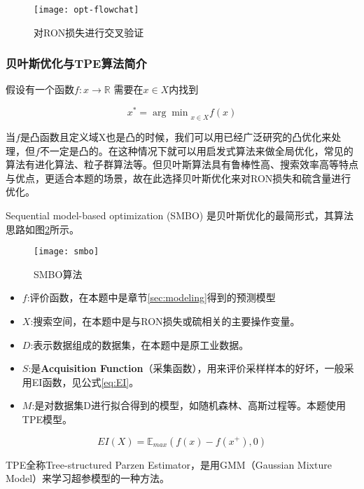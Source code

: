 \documentclass[bwprint]{gmcmthesis}
\begin{document}
\begin{figure}[htb]
	\centering
	\texttt{[image: opt-flowchat]}
	\caption{对RON损失进行交叉验证}
	\label{img:opt-flowchat}
\end{figure}




\FloatBarrier
\subsubsection{贝叶斯优化与TPE算法简介}

假设有一个函数$f:x\rightarrow \mathbb{R}$ 需要在$x\in X$内找到

\begin{equation}\label{eq:optimation}
	x^*={\arg\min}_{x\in X}f(x)
\end{equation}

当$f$是凸函数且定义域X也是凸的时候，我们可以用已经广泛研究的凸优化来处理，但$f$不一定是凸的。在这种情况下就可以用启发式算法来做全局优化，常见的算法有进化算法、粒子群算法等。但贝叶斯算法具有鲁棒性高、搜索效率高等特点与优点，更适合本题的场景，故在此选择贝叶斯优化来对RON损失和硫含量进行优化。

Sequential model-based optimization (SMBO) 是贝叶斯优化的最简形式，其算法思路如图\ref{img:smbo}所示。

\begin{figure}[htb]
	\centering
	\texttt{[image: smbo]}
	\caption{SMBO算法}
	\label{img:smbo}
\end{figure}

\begin{itemize}
	\item $f$:评价函数，在本题中是章节\ref{sec:modeling}得到的预测模型
	\item $X$:搜索空间，在本题中是与RON损失或硫相关的主要操作变量。
	\item $D$:表示数据组成的数据集，在本题中是原工业数据。
	\item $S$:是\textbf{Acquisition Function}（采集函数），用来评价采样样本的好坏，一般采用EI函数，见公式\eqref{eq:EI}。
	\item $\mathit{M}$:是对数据集D进行拟合得到的模型，如随机森林、高斯过程等。本题使用TPE模型。
\end{itemize}

\begin{equation}\label{eq:EI}
	EI(X)=\mathbb{E}_{max}(f(x)-f(x^+), 0)
\end{equation}

TPE全称Tree-structured Parzen Estimator，是用GMM（Gaussian Mixture Model）来学习超参模型的一种方法。
\end{document}
